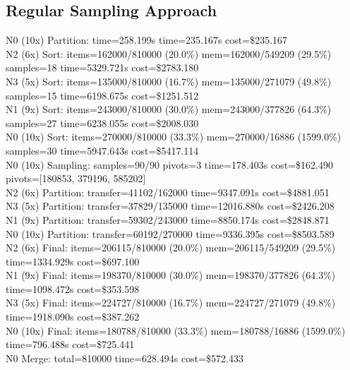 \documentclass[]{interact}
\theoremstyle{plain}
\theoremstyle{definition}
\theoremstyle{remark}
\begin{document}
\subsection{Regular Sampling Approach}
N0 (10x) Partition: time=258.199\textmu s time=235.167\textmu s cost=\$235.167\\
N2 (6x) Sort: items=162000/810000 (20.0\%) mem=162000/549209 (29.5\%) samples=18 time=5329.721\textmu s cost=\$2783.180\\
N3 (5x) Sort: items=135000/810000 (16.7\%) mem=135000/271079 (49.8\%) samples=15 time=6198.675\textmu s cost=\$1251.512\\
N1 (9x) Sort: items=243000/810000 (30.0\%) mem=243000/377826 (64.3\%) samples=27 time=6238.055\textmu s cost=\$2008.030\\
N0 (10x) Sort: items=270000/810000 (33.3\%) mem=270000/16886 (1599.0\%) samples=30 time=5947.643\textmu s cost=\$5417.114\\
N0 (10x) Sampling: samples=90/90 pivots=3 time=178.403\textmu s cost=\$162.490 pivots=[180853, 379196, 585202]\\
N2 (6x) Partition: transfer=41102/162000 time=9347.091\textmu s cost=\$4881.051\\
N3 (5x) Partition: transfer=37829/135000 time=12016.880\textmu s cost=\$2426.208\\
N1 (9x) Partition: transfer=59302/243000 time=8850.174\textmu s cost=\$2848.871\\
N0 (10x) Partition: transfer=60192/270000 time=9336.395\textmu s cost=\$8503.589\\
N2 (6x) Final: items=206115/810000 (20.0\%) mem=206115/549209 (29.5\%) time=1334.929\textmu s cost=\$697.100\\
N1 (9x) Final: items=198370/810000 (30.0\%) mem=198370/377826 (64.3\%) time=1098.472\textmu s cost=\$353.598\\
N3 (5x) Final: items=224727/810000 (16.7\%) mem=224727/271079 (49.8\%) time=1918.090\textmu s cost=\$387.262\\
N0 (10x) Final: items=180788/810000 (33.3\%) mem=180788/16886 (1599.0\%) time=796.488\textmu s cost=\$725.441\\
N0 Merge: total=810000 time=628.494\textmu s cost=\$572.433
\end{document}
